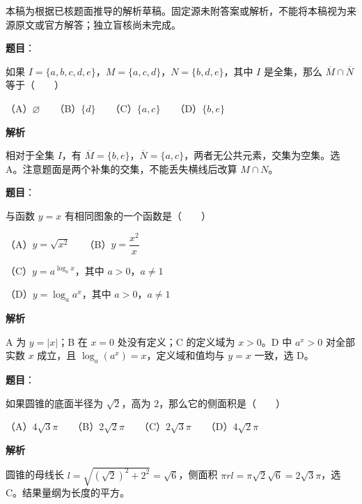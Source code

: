 

\begin{gktip}
本稿为根据已核题面推导的解析草稿。固定源未附答案或解析，不能将本稿视为来源原文或官方解答；独立盲核尚未完成。
\end{gktip}

\begin{answer}

\textbf{题目}：

如果 $I=\{a,b,c,d,e\}$，$M=\{a,c,d\}$，$N=\{b,d,e\}$，其中 $I$ 是全集，那么 $\overline M\cap\overline N$ 等于\mbox{（　　）}

（A）$\varnothing$　　（B）$\{d\}$　　（C）$\{a,c\}$　　（D）$\{b,e\}$

\textbf{解析}

相对于全集 $I$，有 $\overline M=\{b,e\}$，$\overline N=\{a,c\}$，两者无公共元素，交集为空集。选 A。注意题面是两个补集的交集，不能丢失横线后改算 $M\cap N$。


\end{answer}
\begin{answer}

\textbf{题目}：

与函数 $y=x$ 有相同图象的一个函数是\mbox{（　　）}

（A）$y=\sqrt{x^2}$　　（B）$y=\dfrac{x^2}{x}$

（C）$y=a^{\log_a x}$，其中 $a>0$，$a\ne1$

（D）$y=\log_a a^x$，其中 $a>0$，$a\ne1$

\textbf{解析}

A 为 $y=|x|$；B 在 $x=0$ 处没有定义；C 的定义域为 $x>0$。D 中 $a^x>0$ 对全部实数 $x$ 成立，且 $\log_a(a^x)=x$，定义域和值均与 $y=x$ 一致，选 D。


\end{answer}
\begin{answer}

\textbf{题目}：

如果圆锥的底面半径为 $\sqrt2$，高为 $2$，那么它的侧面积是\mbox{（　　）}

（A）$4\sqrt3\pi$　　（B）$2\sqrt2\pi$　　（C）$2\sqrt3\pi$　　（D）$4\sqrt2\pi$

\textbf{解析}

圆锥的母线长 $l=\sqrt{(\sqrt2)^2+2^2}=\sqrt6$，侧面积 $\pi rl=\pi\sqrt2\sqrt6=2\sqrt3\pi$，选 C。结果量纲为长度的平方。


\end{answer}
